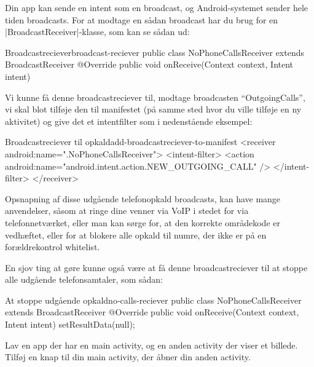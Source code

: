 Din app kan sende en intent som en broadcast, og Android-systemet sender hele tiden broadcasts. For at modtage en sådan broadcast har du brug for en \JavaInline|BroadcastReceiver|-klasse, som kan se sådan ud:

\begin{example}\noindent
	\begin{JavaCode}{Broadcastreciever}{broadcast-reciever}
		public class NoPhoneCallsReceiver extends BroadcastReceiver {
			@Override
			public void onReceive(Context context, Intent intent) {
			}
		}
	\end{JavaCode}
\end{example}

Vi kunne få denne broadcastreciever til, modtage broadcasten ``OutgoingCalls'', vi skal blot tilføje den til manifestet (på samme sted hvor du ville tilføje en ny aktivitet) og give det et intentfilter som i nedenstående eksempel:

\begin{example}\noindent
	\begin{XmlCode}{Broadcastreciever til opkald}{add-broadcastreciever-to-manifest}
		<receiver android:name=".NoPhoneCallsReceiver">
			<intent-filter>
				<action android:name="android.intent.action.NEW_OUTGOING_CALL" />
			</intent-filter>
		</receiver>
	\end{XmlCode}
\end{example}

Opsnapning af disse udgående telefonopkald broadcasts, kan have mange anvendelser, såsom at ringe dine venner via VoIP i stedet for via telefonnetværket, eller man kan sørge for, at den korrekte områdekode er vedhæftet, eller for at blokere alle opkald til numre, der ikke er på en forældrekontrol whitelist.

En sjov ting at gøre kunne også være at få denne broadcastreciever til at stoppe alle udgående telefonsamtaler, som sådan:

\begin{example}\noindent
	\begin{JavaCode}{At stoppe udgående opkald}{no-calls-reciever}
		public class NoPhoneCallsReceiver extends BroadcastReceiver {
			@Override
			public void onReceive(Context context, Intent intent) {
				setResultData(null);
			}
		}
	\end{JavaCode}
\end{example}

\begin{exercise}
	Lav en app der har en main activity, og en anden activity der viser et billede. Tilføj en knap til din main activity, der åbner din anden activity.
\end{exercise}

